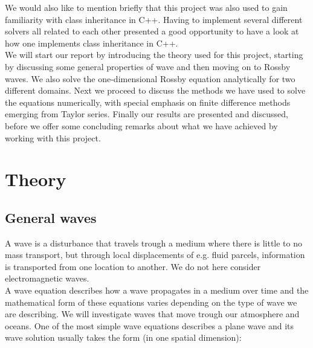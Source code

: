 \documentclass[12pt]{article}
\numberwithin{figure}{section}
\numberwithin{table}{section}
\begin{document}
\noindent We would also like to mention briefly that this project was also used to gain familiarity with class inheritance in C++. Having to implement several different solvers all related to each other presented a good opportunity to have a look at how one implements class inheritance in C++.\\


\noindent We will start our report by introducing the theory used for this project, starting by discussing some general properties of wave and then moving on to Rossby waves. We also solve the one-dimensional Rossby equation analytically for two different domains. Next we proceed to discuss the methods we have used to solve the equations numerically, with special emphasis on finite difference methods emerging from Taylor series. Finally our results are presented and discussed, before we offer some concluding remarks about what we have achieved by working with this project.\\    

\section{Theory} \label{sec:theory}

\subsection{General waves}
\label{generalWaves}
A wave is a disturbance that travels trough a medium where there is little to no mass transport, but through local displacements of e.g. fluid parcels, information is transported from one location to another. We do not here consider electromagnetic waves. \\   


\noindent A wave equation describes how a wave propagates in a medium over time and the mathematical form of these equations varies depending on the type of wave we are describing. We will investigate waves that move trough our atmosphere and oceans. One of the most simple wave equations describes a plane wave and its wave solution usually takes the form (in one spatial dimension):
\end{document}

